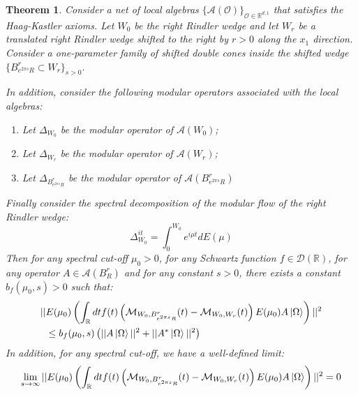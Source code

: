 \documentclass[a4paper,11pt]{article}
\newtheorem{theorem}{Theorem}
\theoremstyle{definition}
\newcommand{\lb}{\left(}
\newcommand{\rb}{\right)}
\begin{document}
\begin{theorem}\label{theorem:approxscattering}
    Consider a net of local algebras $\{\mathcal{A}(\mathcal{O})\}_{\mathcal{O}\in\mathbb{R}^{d,1}}$ that satisfies the Haag-Kastler axioms. Let $W_0$ be the right Rindler wedge and let $W_r$ be a translated right Rindler wedge shifted to the right by $r > 0$ along the $x_1$ direction. Consider a one-parameter family of shifted double cones inside the shifted wedge $\{ B^r_{e^{2\pi s}R}\subset W_r\}_{s > 0}$. 

    In addition, consider the following modular operators associated with the local algebras:
    \begin{enumerate}
        \item Let $\Delta_{W_0}$ be the modular operator of $\mathcal{A}(W_0)$;
        \item Let $\Delta_{W_r}$ be the modular operator of $\mathcal{A}(W_r)$;
        \item Let $\Delta_{B^r_{e^{2\pi s}R}}$ be the modular operator of $\mathcal{A}(B^r_{e^{2\pi s}R})$
    \end{enumerate}
    Finally consider the spectral decomposition of the modular flow of the right Rindler wedge:
    \begin{equation}
        \Delta_{W_0}^{it} = \int_0^{W_0}e^{i\mu t}dE(\mu)
    \end{equation}
    Then for any spectral cut-off $\mu_0 > 0$, for any Schwartz function $f\in \mathcal{D}(\mathbb{R})$, for any operator $A\in\mathcal{A}(B^r_R)$ and for any constant $s > 0$, there exists a constant $b_f(\mu_0, s) > 0$ such that:
    \begin{align}
        \begin{split}
            ||&E(\mu_0)\lb\int_\mathbb{R} dt f(t)\lb \mathcal{M}_{W_0, B^r_{e^{2\pi s}R}}(t) - \mathcal{M}_{W_0, W_r}(t) \rb E(\mu_0)A\ket{\Omega}\rb||^2 \\&\leq b_f(\mu_0, s)\lb||A\ket{\Omega}||^2 + ||A^*\ket{\Omega}||^2\rb
        \end{split}
    \end{align}
    In addition, for any spectral cut-off, we have a well-defined limit:
    \begin{equation}
        \lim_{s\rightarrow\infty}||E(\mu_0)\lb\int_\mathbb{R} dt f(t)\lb \mathcal{M}_{W_0, B^r_{e^{2\pi s}R}}(t) - \mathcal{M}_{W_0, W_r}(t) \rb E(\mu_0)A\ket{\Omega}\rb||^2 = 0
    \end{equation}
\end{theorem}
\end{document}
